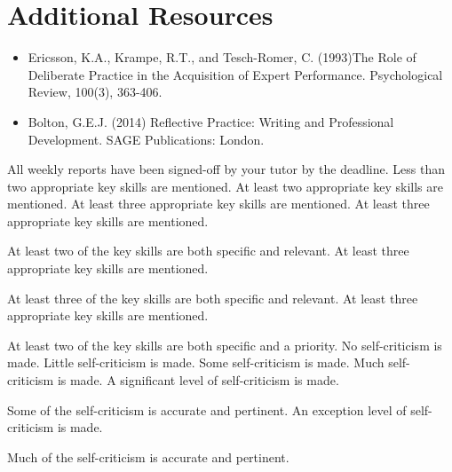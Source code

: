 \documentclass{../fal_assignment}
\begin{document}
\section*{Additional Resources}

\begin{itemize}
    \item Ericsson, K.A., Krampe, R.T., and Tesch-Romer, C. (1993)The Role of Deliberate Practice in the Acquisition of Expert Performance. Psychological Review, 100(3), 363-406.
    \item Bolton, G.E.J. (2014) Reflective Practice: Writing and Professional Development. SAGE Publications: London.
\end{itemize}

\begin{markingrubric}
%
        \grade 		All weekly reports have been signed-off by your tutor by the deadline.
%
        \grade\fail 	Less than two appropriate key skills are mentioned.
        \grade 		At least two appropriate key skills are mentioned.
        \grade 		At least three appropriate key skills are mentioned.
        \grade 		At least three appropriate key skills are mentioned.
        \par 		At least two of the key skills are both specific and relevant.
        \grade 		At least three appropriate key skills are mentioned.
        \par 		At least three of the key skills are both specific and relevant.
        \grade 		At least three appropriate key skills are mentioned.
        \par 		At least two of the key skills are both specific and a priority.
%
        \grade\fail 	No self-criticism is made.
        \grade 		Little self-criticism is made.
        \grade 		Some self-criticism is made.
        \grade 		Much self-criticism is made.
        \grade 		A significant level of self-criticism is made.
            \par 		Some of the self-criticism is accurate and pertinent.
        \grade 		An exception level of self-criticism is made.
            \par 		Much of the self-criticism is accurate and pertinent.
%

\end{markingrubric}
\end{document}

